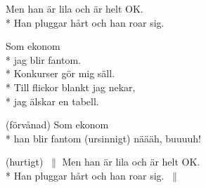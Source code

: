 \begin{SongText}
    \begin{SongVerse}
        Men han är lila och är helt OK.\\*%
        Han pluggar hårt och han roar sig.
    \end{SongVerse}
    \begin{SongVerse}
        Som ekonom\\*%
        jag blir fantom.\\*%
        Konkurser gör mig säll.\\*%
        Till flickor blankt jag nekar,\\*%
        jag älskar en tabell.
    \end{SongVerse}
    \begin{SongVerse}
        (förvånad) Som ekonom\\*%
        han blir fantom (ursinnigt) näääh, buuuuh!
    \end{SongVerse}
    \begin{SongVerse}
        (hurtigt) $\:\|$ Men han är lila och är helt OK.\\*%
        Han pluggar hårt och han roar sig. $\:\|$
    \end{SongVerse}
\end{SongText}

